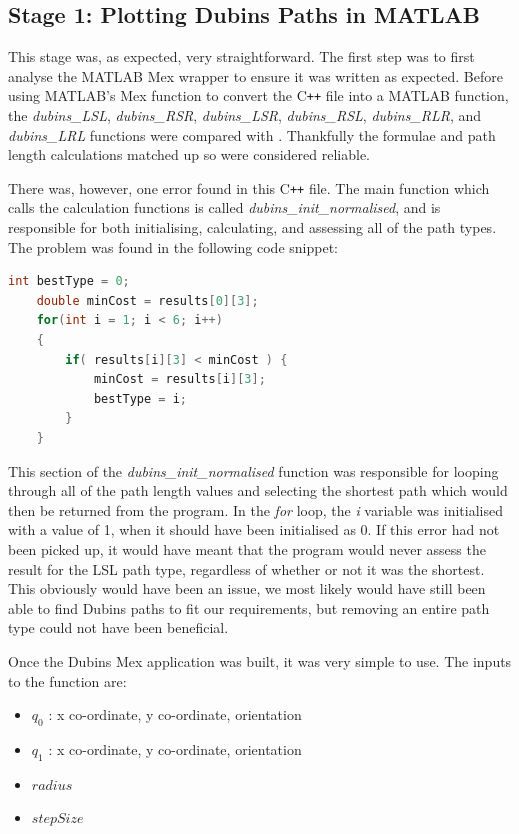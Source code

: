 \subsection{Stage 1: Plotting Dubins Paths in MATLAB}
\label{task1:implementation:stage1}

This stage was, as expected, very straightforward. The first step was to first analyse the MATLAB Mex wrapper to ensure it was written as expected. Before using MATLAB's Mex function to convert the C\texttt{++} file into a MATLAB function, the \textit{dubins\_LSL}, \textit{dubins\_RSR}, \textit{dubins\_LSR}, \textit{dubins\_RSL}, \textit{dubins\_RLR}, and \textit{dubins\_LRL} functions were compared with \cite{shkel2001classification}. Thankfully the formulae and path length calculations matched up so were considered reliable. 

There was, however, one error found in this C\texttt{++} file. The main function which calls the calculation functions is called \textit{dubins\_init\_normalised}, and is responsible for both initialising, calculating, and assessing all of the path types. The problem was found in the following code snippet: 

\begin{minipage}{\linewidth}
\begin{lstlisting}[language=C++]
    int bestType = 0;
    double minCost = results[0][3];
    for(int i = 1; i < 6; i++) 
    {
        if( results[i][3] < minCost ) {
            minCost = results[i][3];
            bestType = i;
        } 
    }
\end{lstlisting}
\end{minipage}

This section of the \textit{dubins\_init\_normalised} function was responsible for looping through all of the path length values and selecting the shortest path which would then be returned from the program. In the \textit{for} loop, the \textit{i} variable was initialised with a value of 1, when it should have been initialised as 0. If this error had not been picked up, it would have meant that the program would never assess the result for the LSL path type, regardless of whether or not it was the shortest. This obviously would have been an issue, we most likely would have still been able to find Dubins paths to fit our requirements, but removing an entire path type could not have been beneficial. 

Once the Dubins Mex application was built, it was very simple to use. The inputs to the function are:
\begin{itemize}
	\item $q_0$ : x co-ordinate, y co-ordinate, orientation
	\item $q_1$ : x co-ordinate, y co-ordinate, orientation
	\item $radius$
	\item $stepSize$
\end{itemize}

